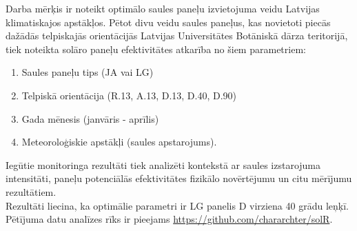 Darba mērķis ir noteikt optimālo saules paneļu izvietojuma veidu Latvijas klimatiskajos apstākļos. 
Pētot divu veidu saules paneļus, kas novietoti piecās dažādās telpiskajās orientācijās Latvijas Universitātes Botāniskā dārza teritorijā, tiek noteikta solāro paneļu efektivitātes atkarība no šiem parametriem:
\begin{enumerate}
\item Saules paneļu tips (JA vai LG)
\item Telpiskā orientācija (R.13, A.13, D.13, D.40, D.90)
\item Gada mēnesis (janvāris - aprīlis)
\item Meteoroloģiskie apstākļi (saules apstarojums).
\end{enumerate}

Iegūtie monitoringa rezultāti tiek analizēti kontekstā ar saules izstarojuma intensitāti, paneļu potenciālās efektivitātes fizikālo novērtējumu un citu mērījumu rezultātiem.\\
Rezultāti liecina, ka optimālie parametri ir LG panelis D virziena 40 grādu leņķī. Pētījuma datu analīzes rīks ir pieejams \url{https://github.com/chararchter/solR}.

